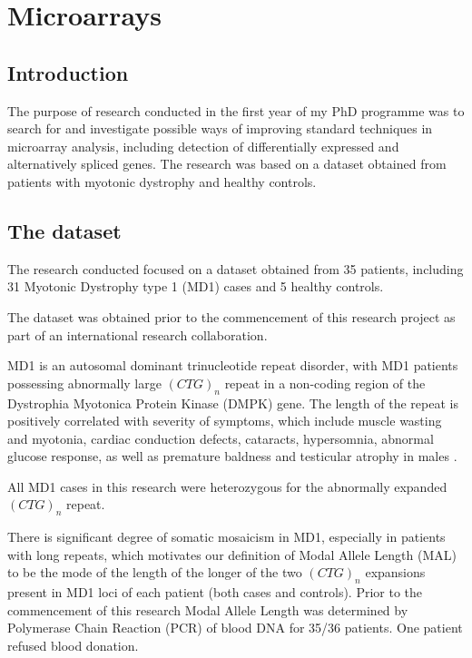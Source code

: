 \chapter{Microarrays}
\label{c:microarrays}
\section{Introduction}

The purpose of research conducted in the first year of my PhD programme was to search for and investigate possible ways of improving standard techniques in microarray analysis, including detection of differentially expressed and alternatively spliced genes. The research was based on a dataset obtained from patients with myotonic dystrophy and healthy controls. 

\section{The dataset} \label{chapter_dataset}

The research conducted  focused on a dataset obtained from 35 patients, including 31 Myotonic Dystrophy type 1 (MD1) cases and 5 healthy controls.

The dataset was obtained prior to the commencement of this research project as part of an international research collaboration.

MD1 is an autosomal dominant trinucleotide repeat disorder, with MD1 patients possessing abnormally large $(CTG)_n$ repeat in a non-coding region of the Dystrophia Myotonica Protein Kinase (DMPK) gene. The length of the repeat is positively correlated with severity of symptoms, which include muscle wasting and myotonia, cardiac conduction defects, cataracts, hypersomnia, abnormal glucose response, as well as premature baldness and testicular atrophy in males \parencite{Brook1992}.

All MD1 cases in this research were heterozygous for the abnormally expanded $(CTG)_n$ repeat.

There is significant degree of somatic mosaicism in MD1, especially in patients with long repeats, which motivates our definition of Modal Allele Length (MAL) to be the mode of the length of the longer of the two $(CTG)_n$ expansions present in MD1 loci of each patient (both cases and controls). Prior to the commencement of this research Modal Allele Length was determined by Polymerase Chain Reaction (PCR) of blood DNA for 35/36 patients. One patient refused blood donation.

